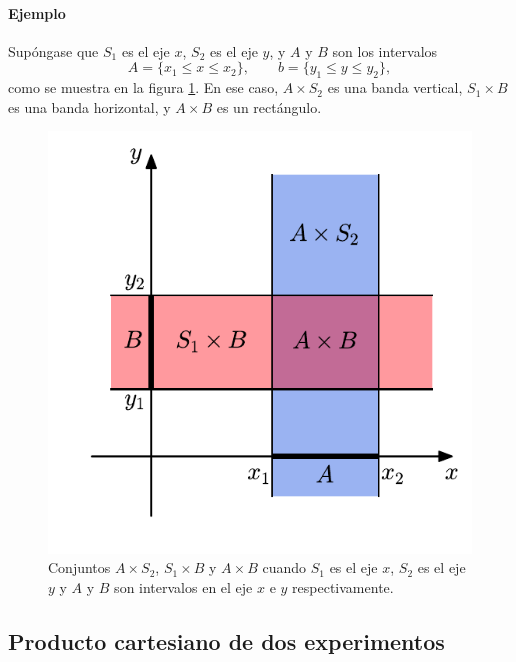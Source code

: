 \documentclass[a4paper]{report}
\begin{document}
\paragraph{Ejemplo} Supóngase que \(S_1\) es el eje \(x\), \(S_2\) es el eje \(y\), y \(A\) y \(B\) son los intervalos
\[
 A=\{x_1\leq x\leq x_2\},\qquad b=\{y_1\leq y\leq y_2\},
\]
como se muestra en la figura \ref{fig:set_intersection_axis_xy}. En ese caso, \(A\times S_2\) es una banda vertical, \(S_1\times B\) es una banda horizontal, y \(A\times B\) es un rectángulo.
\begin{figure}[!htb]
  \begin{minipage}[c]{0.4\textwidth}
    \includegraphics[width=\textwidth]{figuras/set_intersection_axis_xy.pdf}
  \end{minipage}\hfill
  \begin{minipage}[c]{0.5\textwidth}
    \caption{
       Conjuntos \(A\times S_2\), \(S_1\times B\) y \(A\times B\) cuando \(S_1\) es el eje \(x\), \(S_2\) es el eje \(y\) y \(A\) y \(B\) son intervalos en el eje \(x\) e \(y\) respectivamente.
    } \label{fig:set_intersection_axis_xy}
  \end{minipage}
\end{figure}

\subsection{Producto cartesiano de dos experimentos}
\end{document}
